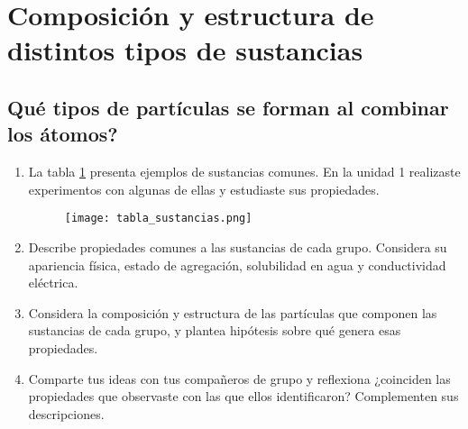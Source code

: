 \thispagestyle{plain}
\section{Composición y estructura de distintos tipos de sustancias}


\subsection{Qué tipos de partículas se forman al combinar los átomos?}
\begin{boxK}
    \begin{enumerate}
        \item La tabla \ref{tab:tabla_sustancias} presenta ejemplos de sustancias comunes. En la unidad 1 realizaste experimentos con algunas de ellas y estudiaste sus propiedades.
              \begin{figure}[H]
                  \centering
                  \texttt{[image: tabla\_sustancias.png]}
                  \label{tab:tabla_sustancias}
              \end{figure}
        \item Describe propiedades comunes a las sustancias de cada grupo. Considera su apariencia física, estado de agregación, solubilidad en agua y conductividad eléctrica.
        \item Considera la composición y estructura de las partículas que componen las sustancias de cada grupo, y plantea hipótesis sobre qué genera esas propiedades.
        \item Comparte tus ideas con tus compañeros de grupo y reflexiona ¿coinciden las propiedades que observaste con las que ellos identificaron? Complementen sus descripciones.
    \end{enumerate}
\end{boxK}

